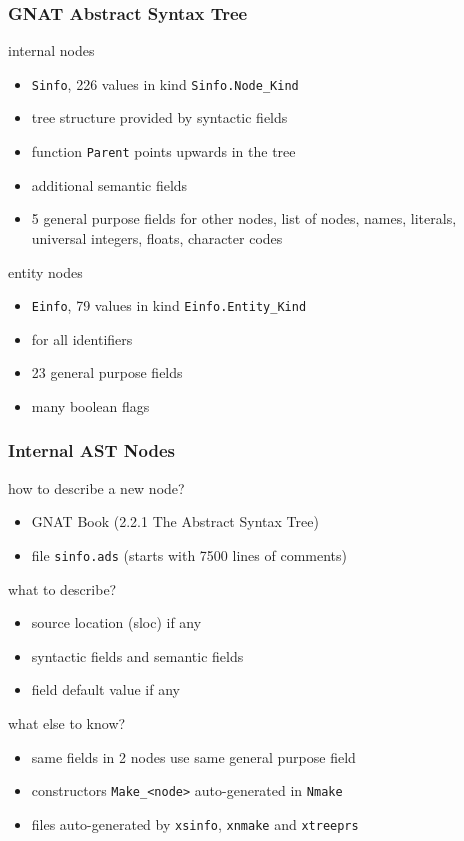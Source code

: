 \documentclass{beamer}
\newcommand{\vs}{\vspace{0.5cm}}
\newenvironment{specialframe}{%
  \begin{frame}[fragile,environment=specialframe]}{\end{frame}}
\begin{document}
\begin{specialframe}
  \frametitle{GNAT Abstract Syntax Tree}

\begin{block}{internal nodes}
  \begin{itemize}
  \item \verb|Sinfo|, 226 values in kind \verb|Sinfo.Node_Kind|
  \item tree structure provided by syntactic fields
  \item function \verb|Parent| points upwards in the tree
  \item additional semantic fields
  \item 5 general purpose fields for other nodes, list of nodes, names,
    literals, universal integers, floats, character codes
  \end{itemize}
\end{block}

\begin{block}{entity nodes}
  \begin{itemize}
  \item \verb|Einfo|, 79 values in kind \verb|Einfo.Entity_Kind|
  \item for all identifiers
  \item 23 general purpose fields
  \item many boolean flags
  \end{itemize}
\end{block}

\end{specialframe}

\begin{specialframe}
  \frametitle{Internal AST Nodes}

how to describe a new node?
\begin{itemize}
\item GNAT Book (2.2.1 The Abstract Syntax Tree)
\item file \verb|sinfo.ads| (starts with 7500 lines of comments)
\end{itemize}

\vs

what to describe?
\begin{itemize}
\item source location (sloc) if any
\item syntactic fields and semantic fields
\item field default value if any
\end{itemize}

\vs

what else to know?
\begin{itemize}
\item same fields in 2 nodes use same general purpose field
\item constructors \verb|Make_<node>| auto-generated in \verb|Nmake|
\item files auto-generated by \verb|xsinfo|, \verb|xnmake| and \verb|xtreeprs|
\end{itemize}

\end{specialframe}
\end{document}
